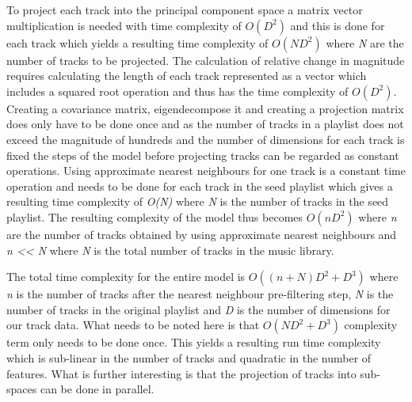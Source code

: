 \documentclass[a4paper,11pt]{kth-mag}
\begin{document}
To project each track into the principal component space a matrix vector multiplication is needed with time complexity of $O(D^2)$ and this is done for each track which yields a resulting time complexity of $O(ND^2)$ where \textit{N} are the number of tracks to be projected. The calculation of relative change in magnitude requires calculating the length of each track represented as a vector which includes a squared root operation and thus has the time complexity of $O(D^2)$. Creating a covariance matrix, eigendecompose it and creating a projection matrix does only have to be done once and as the number of tracks in a playlist does not exceed the magnitude of hundreds and the number of dimensions for each track is fixed the steps of the model before projecting tracks can be regarded as constant operations. Using approximate nearest neighbours for one track is a constant time operation and needs to be done for each track in the seed playlist which gives a resulting time complexity of \textit{O(N)} where \textit{N} is the number of tracks in the seed playlist. The resulting complexity of the model thus becomes $O(nD^2)$ where \textit{n} are the number of tracks obtained by using approximate nearest neighbours and \textit{n << N} where \textit{N} is the total number of tracks in the music library. 

The total time complexity for the entire model is $O((n+N)D^2 + D^3)$ where \textit{n} is the number of tracks after the nearest neighbour pre-filtering step, \textit{N} is the number of tracks in the original playlist and \textit{D} is the number of dimensions for our track data. What needs to be noted here is that $O(ND^2 + D^3)$ complexity term only needs to be done once. This yields a resulting run time complexity which is sub-linear in the number of tracks and quadratic in the number of features. What is further interesting is that the projection of tracks into sub-spaces can be done in parallel. 
\pagebreak
 
\end{document}
